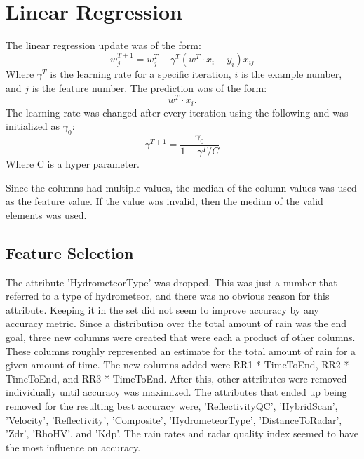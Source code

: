\documentclass[pdftex,a4paper,12pt]{article}
\begin{document}
\section{Linear Regression}
The linear regression update was of the form:
$$w^{T + 1}_j = w^{T}_j - \gamma^T(w^{T} \cdot x_{i} - y_i)x_{ij}$$
Where $\gamma^T$ is the learning rate for a specific iteration, $i$ is the example number, and $j$ is the feature number. The prediction was of the form:
$$w^{T} \cdot x_{i}.$$
The learning rate was changed after every iteration using the following and was initialized as $\gamma_0$:
$$\gamma^{T + 1} = \frac{\gamma_{0}}{1 + \gamma^{T} / C}$$
Where C is a hyper parameter.




Since the columns had multiple values, the median of the column values was used as the feature value. If the value was invalid, then the median of the valid elements was used.
\subsection{Feature Selection}
The attribute 'HydrometeorType' was dropped. This was just a number that referred to a type of hydrometeor, and there was no obvious reason for this attribute. Keeping it in the set did not seem to improve accuracy by any accuracy metric. Since a distribution over the total amount of rain was the end goal, three new columns were created that were each a product of other columns. These columns roughly represented an estimate for the total amount of rain for a given amount of time. The new columns added were RR1 * TimeToEnd, RR2 * TimeToEnd, and RR3 * TimeToEnd. After this, other attributes were removed individually until accuracy was maximized. The attributes that ended up being removed for the resulting best accuracy were, 'ReflectivityQC', 'HybridScan', 'Velocity', 'Reflectivity', 'Composite', 'HydrometeorType', 'DistanceToRadar', 'Zdr', 'RhoHV', and 'Kdp'. The rain rates and radar quality index seemed to have the most influence on accuracy.
\end{document}
